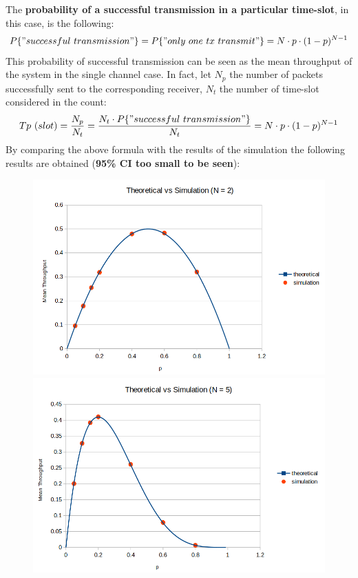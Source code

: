 \noindent The \textbf{probability of a successful transmission in a particular time-slot}, in this case, is the following:
\begin{equation}
	P\{" successful\ transmission"\} = P\{"only\ one\ tx\ transmit"\} = N\cdot p \cdot(1-p)^{N-1}
\end{equation}
This probability of successful transmission can be seen as the mean throughput of the system in the single channel case. In fact, let $N_{p}$ the number of packets successfully sent to the corresponding receiver, $N_{t}$ the number of time-slot considered in the count:
\begin{align*}
Tp\ (slot) = \frac{N_{p}}{N_{t}} = \frac{N_{t}\cdot P\{"successful\ transmission"\}}{N_{t}} = N\cdot p\cdot (1-p)^{N-1}
\end{align*}
By comparing the above formula with the results of the simulation the following results are obtained (\textbf{95\% CI too small to be seen}):
\begin{figure}[H]
	\begin{minipage}[b]{0.55\textwidth}
		\includegraphics[width=\textwidth]{img/SecondVerificationN2.png}
	\end{minipage}
	\begin{minipage}[b]{0.55\textwidth}
		\includegraphics[width=\textwidth]{img/SecondVerificationN5.png}
	\end{minipage}
\end{figure}
